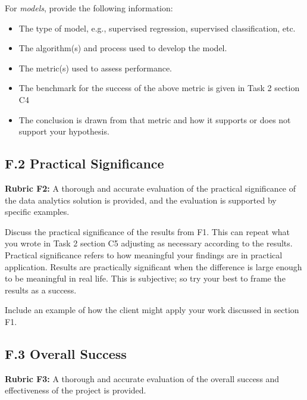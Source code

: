 For \emph{models}, provide the following information:~

\begin{itemize}
\item
  The type of model, e.g., supervised regression, supervised
  classification, etc.~~
\item
  The algorithm(s) and process used to develop the model.~
\end{itemize}

\begin{itemize}
\item
  The metric(s) used to assess performance.~~
\item
  The benchmark for the success of the above metric is given in Task 2
  section C4
\item
  The conclusion is drawn from that metric and how it supports or does
  not support your hypothesis.
\end{itemize}

\hypertarget{f.2-practical-significance}{%
\subsection{\texorpdfstring{F.2 Practical Significance
}{F.2 Practical Significance }}\label{f.2-practical-significance}}

\textbf{Rubric F2:} A thorough and accurate evaluation of the practical
significance of the data analytics solution is provided, and the
evaluation is supported by specific examples.

Discuss the practical significance of the results from F1. This can
repeat what you wrote in Task 2 section C5 adjusting as necessary
according to the results. Practical significance refers to how
meaningful your findings are in practical application. Results are
practically significant when the difference is large enough to be
meaningful in real life. This is subjective; so try your best to frame
the results as a success.

Include an example of how the client might apply your work discussed in
section F1.

\hypertarget{f.3-overall-success}{%
\subsection{F.3 Overall Success}\label{f.3-overall-success}}

\textbf{Rubric F3:} A thorough and accurate evaluation of the overall
success and effectiveness of the project is provided.

